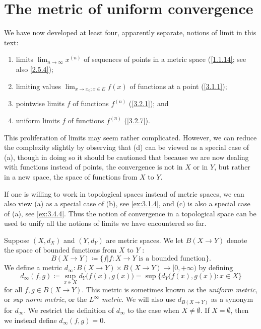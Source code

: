 \section{The metric of uniform convergence}\label{sec:3.4}

\begin{note}
  We have now developed at least four, apparently separate, notions of limit in this text:
  \begin{enumerate}
    \item limits \(\lim_{n \to \infty} x^{(n)}\) of sequences of points in a metric space
          (\cref{1.1.14};
          see also \cref{2.5.4});
    \item limiting values \(\lim_{x \to x_0 ; x \in E} f(x)\) of functions at a point
          (\cref{3.1.1});
    \item pointwise limits \(f\) of functions \(f^{(n)}\)
          (\cref{3.2.1});
          and
    \item uniform limits \(f\) of functions \(f^{(n)}\)
          (\cref{3.2.7}).
  \end{enumerate}

  This proliferation of limits may seem rather complicated.
  However, we can reduce the complexity slightly by observing that (d) can be viewed as a special case of (a), though in doing so it should be cautioned that because we are now dealing with functions instead of points, the convergence is not in \(X\) or in \(Y\), but rather in a new space, the space of functions from \(X\) to \(Y\).
\end{note}

\begin{rmk}\label{3.4.1}
  If one is willing to work in topological spaces instead of metric spaces, we can also view (a) as a special case of (b), see \cref{ex:3.1.4}, and (c) is also a special case of (a), see \cref{ex:3.4.4}.
  Thus the notion of convergence in a topological space can be used to unify all the notions of limits we have encountered so far.
\end{rmk}

\begin{defn}\label{3.4.2}
  Suppose \((X, d_X)\) and \((Y, d_Y)\) are metric spaces.
  We let \(B(X \to Y)\) denote the space of bounded functions from \(X\) to \(Y\) :
  \[
    B(X \to Y) \coloneqq \{f | f : X \to Y \text{ is a bounded function}\}.
  \]
  We define a metric \(d_\infty : B(X \to Y) \times B(X \to Y) \to [0, +\infty)\) by defining
  \[
    d_\infty(f, g) \coloneqq \sup_{x \in X} d_Y\big(f(x), g(x)\big) = \sup\Big\{d_Y\big(f(x), g(x)\big) : x \in X\Big\}
  \]
  for all \(f, g \in B(X \to Y)\).
  This metric is sometimes known as the \emph{uniform metric}, or \emph{sup norm metric}, or the \emph{\(L^\infty\) metric}.
  We will also use \(d_{B(X \to Y)}\) as a synonym for \(d_\infty\).
  We restrict the definition of \(d_\infty\) to the case when \(X \neq \emptyset\).
  If \(X = \emptyset\), then we instead define \(d_\infty(f, g) = 0\).
\end{defn}

